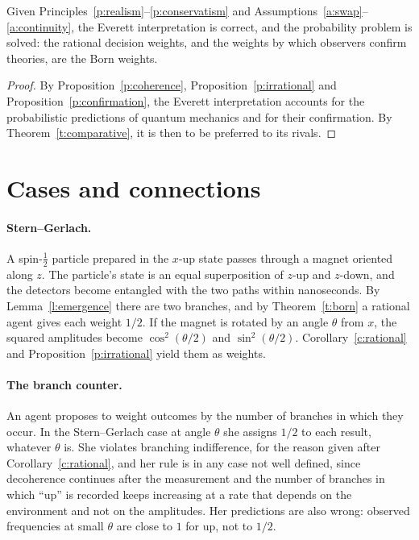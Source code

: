 \documentclass{situationist-preprint}
\begin{document}
\begin{theorem}\label{t:main}
Given Principles~\ref{p:realism}--\ref{p:conservatism} and Assumptions~\ref{a:swap}--\ref{a:continuity}, the Everett interpretation is correct, and the probability problem is solved: the rational decision weights, and the weights by which observers confirm theories, are the Born weights.
\end{theorem}

\begin{proof}
By Proposition~\ref{p:coherence}, Proposition~\ref{p:irrational} and Proposition~\ref{p:confirmation}, the Everett interpretation accounts for the probabilistic predictions of quantum mechanics and for their confirmation. By Theorem~\ref{t:comparative}, it is then to be preferred to its rivals.
\end{proof}

\section{Cases and connections}\label{s:cases}

\paragraph{Stern--Gerlach.} A spin-$\frac12$ particle prepared in the $x$-up state passes through a magnet oriented along $z$. The particle's state is an equal superposition of $z$-up and $z$-down, and the detectors become entangled with the two paths within nanoseconds. By Lemma~\ref{l:emergence} there are two branches, and by Theorem~\ref{t:born} a rational agent gives each weight $1/2$. If the magnet is rotated by an angle $\theta$ from $x$, the squared amplitudes become $\cos^2(\theta/2)$ and $\sin^2(\theta/2)$. Corollary~\ref{c:rational} and Proposition~\ref{p:irrational} yield them as weights.

\paragraph{The branch counter.} An agent proposes to weight outcomes by the number of branches in which they occur. In the Stern--Gerlach case at angle $\theta$ she assigns $1/2$ to each result, whatever $\theta$ is. She violates branching indifference, for the reason given after Corollary~\ref{c:rational}, and her rule is in any case not well defined, since decoherence continues after the measurement and the number of branches in which \enquote{up} is recorded keeps increasing at a rate that depends on the environment and not on the amplitudes. Her predictions are also wrong: observed frequencies at small $\theta$ are close to $1$ for up, not to $1/2$.
\end{document}
